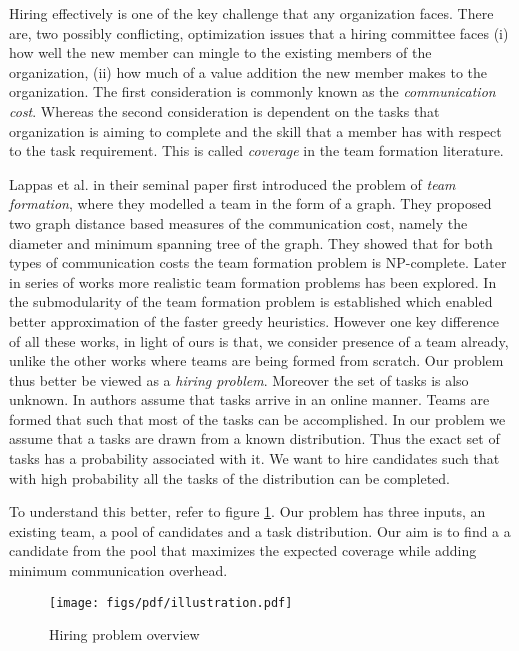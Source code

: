 Hiring effectively is one of the key challenge that any organization faces. There are, two possibly conflicting, optimization issues that a hiring committee faces (i) how well the new member can mingle to the existing members of the organization, (ii) how much of a value addition the new member makes to the organization. The first consideration is commonly known as the \textit{communication cost}. Whereas the second consideration is dependent on the tasks that organization is aiming to complete and the skill that a member has with respect to the task requirement. This is called \textit{coverage} in the team formation literature. 

Lappas et al. \citep{lappas2009finding} in their seminal paper first introduced the problem of \textit{team formation}, where they modelled a team in the form of a graph. They proposed two graph distance based measures of the communication cost, namely the diameter and minimum spanning tree of the graph. They showed that for both types of communication costs the team formation problem is NP-complete. Later in series of works \cite{sozio2010community,kargar2011discovering,anagnostopoulos2010power,rangapuram2013towards} more realistic team  formation problems has been explored. In \cite{bhowmik2014submodularity} the submodularity of the team formation problem is established which enabled better approximation of the faster greedy heuristics. However one key difference of all these works, in light of ours is that, we consider presence of a team already, unlike the other works where teams are being formed from scratch. Our problem thus better be viewed as a \textit{hiring problem}. Moreover the set of tasks is also unknown. In \cite{anagnostopoulos2012online} authors assume that tasks arrive in an online manner. Teams are formed that such that most of the tasks can be accomplished. In our problem we assume that a tasks are drawn from a known distribution. Thus the exact set of tasks has a probability associated with it. We want to hire candidates such that with high probability all the tasks of the distribution can be completed.

To understand this better, refer to figure \ref{fig:hpo}. Our problem has three inputs, an existing team, a pool of candidates and a task distribution. Our aim is to find a a candidate from the pool that maximizes the expected coverage while adding minimum communication overhead. 
\begin{figure}
\centering
\begin{small}
\texttt{[image: figs/pdf/illustration.pdf]}
\caption{Hiring problem overview}
\label{fig:hpo}
\end{small}
\end{figure} 

